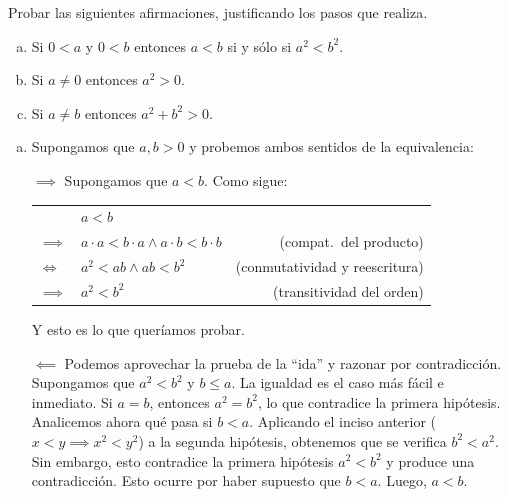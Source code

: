 \begin{problem}{}{}

    Probar las siguientes afirmaciones, justificando los pasos que realiza.

    \begin{enumerate}[(a)]
        \item Si $0 < a$ y $0 < b$ entonces $a < b$ si y sólo si $a^2 < b^2$.
        \item Si $a \neq 0$ entonces $a^2 > 0$.
        \item Si $a \neq b$ entonces $a^2 + b^2 > 0$.
    \end{enumerate}

\end{problem}
\vspace{1ex}

\begin{enumerate}[(a)]
    \item Supongamos que $a, b > 0$ y probemos ambos sentidos de la equivalencia:
    
          $\implies$ Supongamos que $a < b$. Como sigue: \\

          \begin{tabular}{|l l r}
             & $a < b$ & \\
            $\implies$ & $a \cdot a < b \cdot a \land a \cdot b < b \cdot b$ & (compat.\ del producto) \\
            $\iff$ & $a^2 < ab \land ab < b^2$ & (conmutatividad y reescritura) \\
            $\implies$ & $a^2 < b^2$ & (transitividad del orden) \\
          \end{tabular}

          Y esto es lo que queríamos probar.

          $\impliedby$ Podemos aprovechar la prueba de la ``ida'' y razonar por contradicción.
          Supongamos que $a^2 < b^2$ y $b \le a$.
          La igualdad es el caso más fácil e inmediato.
          Si $a = b$, entonces $a^2 = b^2$, lo que contradice la primera hipótesis.
          Analicemos ahora qué pasa si $b < a$.
          Aplicando el inciso anterior ($x < y \implies x^2 < y^2$) a la segunda hipótesis, obtenemos que se verifica $b^2 < a^2$.
          Sin embargo, esto contradice la primera hipótesis $a^2 < b^2$ y produce una contradicción.
          Esto ocurre por haber supuesto que $b < a$.
          Luego, $a < b$.


\end{enumerate}
